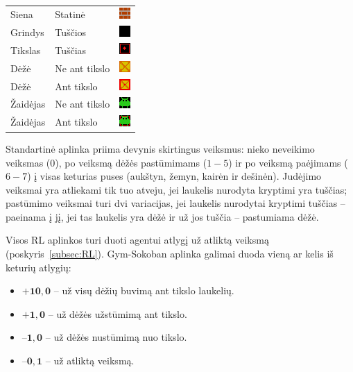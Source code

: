 \documentclass{VUMIFPSbakalaurinis}
\begin{document}
{\begin{table}[H]
\begin{tabular}{llc}
			Siena & Statinė & \includegraphics[scale=.6]{img/sokoban/tiles/wall} \\ 
			\rowcolor[HTML]{EFEFEF} 
			Grindys & Tuščios & \includegraphics[scale=.6]{img/sokoban/tiles/floor} \\ 
			Tikslas & Tuščias & \includegraphics[scale=.6]{img/sokoban/tiles/box_target} \\ 
			\rowcolor[HTML]{EFEFEF} 
			Dėžė & Ne ant tikslo & \includegraphics[scale=.6]{img/sokoban/tiles/box} \\ 
			Dėžė & Ant tikslo & \includegraphics[scale=.6]{img/sokoban/tiles/box_on_target} \\ 
			\rowcolor[HTML]{EFEFEF}  
			Žaidėjas & Ne ant tikslo & \includegraphics[scale=.6]{img/sokoban/tiles/player} \\
			Žaidėjas & Ant tikslo & \includegraphics[scale=.6]{img/sokoban/tiles/player_on_target} \\ 
			
			\bottomrule
		\end{tabular}
	\end{table}
	Standartinė aplinka priima devynis skirtingus veiksmus: nieko neveikimo veiksmas (\(0\)), po veiksmą dėžės pastūmimams (\(1-5\)) ir po veiksmą paėjimams (\(6-7\)) į visas keturias puses (aukštyn, žemyn, kairėn ir dešinėn). Judėjimo veiksmai yra atliekami tik tuo atveju, jei laukelis nurodyta kryptimi yra tuščias; pastūmimo veiksmai turi dvi variacijas, jei laukelis nurodytai kryptimi tuščias -- paeinama į jį, jei tas laukelis yra dėžė ir už jos tuščia -- pastumiama dėžė.\par
	
	Visos RL aplinkos turi duoti agentui atlygį už atliktą veiksmą (poskyris~\ref{subsec:RL}). Gym-Sokoban aplinka galimai duoda vieną ar kelis iš keturių atlygių:
	\begin{itemize}
		\item \(\mathbf{+10,0}\) -- už visų dėžių buvimą ant tikslo laukelių.
		\item \(\mathbf{+1,0}\) -- už dėžės užstūmimą ant tikslo.
		\item \(\mathbf{–1,0}\) -- už dėžės nustūmimą nuo tikslo.
		\item \(\mathbf{–0,1}\) -- už atliktą veiksmą.
	\end{itemize}
	
}
\end{document}
